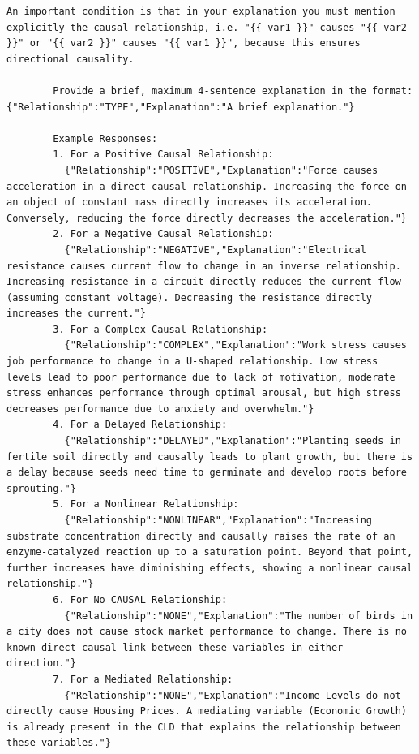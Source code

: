 \begin{lstlisting}[caption={Generator Prompt Configuration: Nitai\_C (\texttt{generateNodes} + \texttt{generateEdges})},label={lst:generator_nitai_c_yaml}]
        An important condition is that in your explanation you must mention explicitly the causal relationship, i.e. "{{ var1 }}" causes "{{ var2 }}" or "{{ var2 }}" causes "{{ var1 }}", because this ensures directional causality.

        Provide a brief, maximum 4-sentence explanation in the format: {"Relationship":"TYPE","Explanation":"A brief explanation."}
        
        Example Responses:
        1. For a Positive Causal Relationship:
          {"Relationship":"POSITIVE","Explanation":"Force causes acceleration in a direct causal relationship. Increasing the force on an object of constant mass directly increases its acceleration. Conversely, reducing the force directly decreases the acceleration."}
        2. For a Negative Causal Relationship:
          {"Relationship":"NEGATIVE","Explanation":"Electrical resistance causes current flow to change in an inverse relationship. Increasing resistance in a circuit directly reduces the current flow (assuming constant voltage). Decreasing the resistance directly increases the current."}
        3. For a Complex Causal Relationship:
          {"Relationship":"COMPLEX","Explanation":"Work stress causes job performance to change in a U-shaped relationship. Low stress levels lead to poor performance due to lack of motivation, moderate stress enhances performance through optimal arousal, but high stress decreases performance due to anxiety and overwhelm."}
        4. For a Delayed Relationship:
          {"Relationship":"DELAYED","Explanation":"Planting seeds in fertile soil directly and causally leads to plant growth, but there is a delay because seeds need time to germinate and develop roots before sprouting."}
        5. For a Nonlinear Relationship:
          {"Relationship":"NONLINEAR","Explanation":"Increasing substrate concentration directly and causally raises the rate of an enzyme-catalyzed reaction up to a saturation point. Beyond that point, further increases have diminishing effects, showing a nonlinear causal relationship."}
        6. For No CAUSAL Relationship:
          {"Relationship":"NONE","Explanation":"The number of birds in a city does not cause stock market performance to change. There is no known direct causal link between these variables in either direction."}
        7. For a Mediated Relationship:
          {"Relationship":"NONE","Explanation":"Income Levels do not directly cause Housing Prices. A mediating variable (Economic Growth) is already present in the CLD that explains the relationship between these variables."}


\end{lstlisting}
